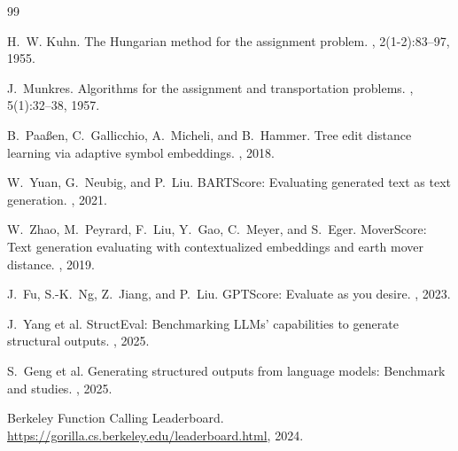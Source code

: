 \documentclass{article}
\begin{document}
\begin{thebibliography}{99}

H.~W. Kuhn.
\newblock The Hungarian method for the assignment problem.
, 2(1-2):83--97, 1955.

J.~Munkres.
\newblock Algorithms for the assignment and transportation problems.
, 5(1):32--38, 1957.

B.~Paaßen, C.~Gallicchio, A.~Micheli, and B.~Hammer.
\newblock Tree edit distance learning via adaptive symbol embeddings.
, 2018.

W.~Yuan, G.~Neubig, and P.~Liu.
\newblock BARTScore: Evaluating generated text as text generation.
, 2021.

W.~Zhao, M.~Peyrard, F.~Liu, Y.~Gao, C.~Meyer, and S.~Eger.
\newblock MoverScore: Text generation evaluating with contextualized embeddings and earth mover distance.
, 2019.

J.~Fu, S.-K.~Ng, Z.~Jiang, and P.~Liu.
\newblock GPTScore: Evaluate as you desire.
, 2023.

J.~Yang et al.
\newblock StructEval: Benchmarking LLMs' capabilities to generate structural outputs.
, 2025.

S.~Geng et al.
\newblock Generating structured outputs from language models: Benchmark and studies.
, 2025.

Berkeley Function Calling Leaderboard.
\newblock \url{https://gorilla.cs.berkeley.edu/leaderboard.html}, 2024.

\end{thebibliography}
\end{document}
